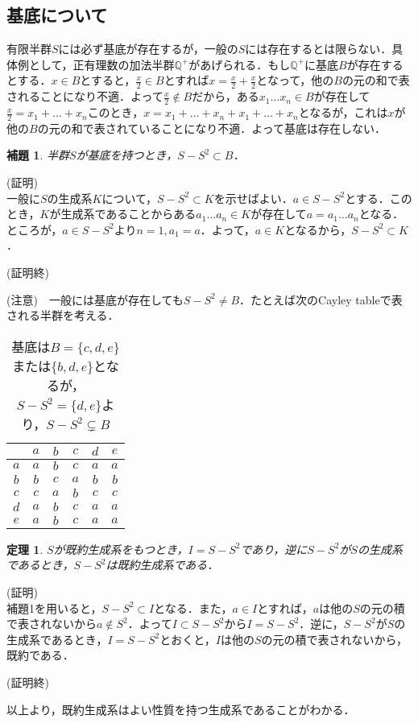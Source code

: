 \documentclass{jsarticle}
\begin{document}
\subsection{基底について}
有限半群$S$には必ず基底が存在するが，一般の$S$には存在するとは限らない．具体例として，正有理数の加法半群$\mathbb Q^{+}$があげられる．もし$\mathbb Q^{+}$に基底$B$が存在するとする．$x\in B$とすると，$\frac{x}{2}\in B$とすれば$x=\frac{x}{2}+\frac{x}{2}$となって，他の$B$の元の和で表されることになり不適．よって$\frac{x}{2}\notin B$だから，ある$x_1\dots x_n\in B$が存在して$\frac{x}{2}=x_1+\dots+x_n$このとき，$x=x_1+\dots+x_n+x_1+\dots+x_n$となるが，これは$x$が他の$B$の元の和で表されていることになり不適．よって基底は存在しない．
\newtheorem{lem}{補題}
\newtheorem{thm}{定理}
\begin{lem}
半群$S$が基底を持つとき，$S-S^2\subset B$．
\end{lem}
(証明) \\
一般に$S$の生成系$K$について，$S-S^2\subset K$を示せばよい．$a\in S-S^2$とする．このとき，$K$が生成系であることからある$a_1\dots a_n\in K$が存在して$a=a_1\dots a_n$となる．ところが，$a\in S-S^2$より$n=1, a_1=a$．よって，$a\in K$となるから，$S-S^2\subset K$．
\begin{flushright}
(証明終)
\end{flushright}
(注意)　一般には基底が存在しても$S-S^2\neq B$．たとえば次のCayley tableで表される半群を考える．
\begin{table}[htb]
\begin{center}
\begin{tabular}{c|ccccc}
     &$a$&$b$&$c$&$d$&$e$ \\ \hline
$a$&$a$&$b$&$c$&$a$&$a$ \\
$b$&$b$&$c$&$a$&$b$&$b$ \\
$c$&$c$&$a$&$b$&$c$&$c$ \\
$d$&$a$&$b$&$c$&$a$&$a$ \\
$e$&$a$&$b$&$c$&$a$&$a$
\end{tabular}
\caption{基底は$B=\{c,d,e\}$または$\{b,d,e\}$となるが，$S-S^2=\{d,e\}$より，$S-S^2\subsetneq B$}
\end{center}
\end{table}
\begin{thm}
$S$が既約生成系をもつとき，$I=S-S^2$であり，逆に$S-S^2$が$S$の生成系であるとき，$S-S^2$は既約生成系である．
\end{thm}
(証明)　\\
補題1を用いると，$S-S^2\subset I$となる．また，$a\in I$とすれば，$a$は他の$S$の元の積で表されないから$a\notin S^2$．よって$I\subset S-S^2$から$I=S-S^2$．逆に，$S-S^2$が$S$の生成系であるとき，$I=S-S^2$とおくと，$I$は他の$S$の元の積で表されないから，既約である．
\begin{flushright}
(証明終)
\end{flushright}
以上より，既約生成系はよい性質を持つ生成系であることがわかる．
\end{document}

